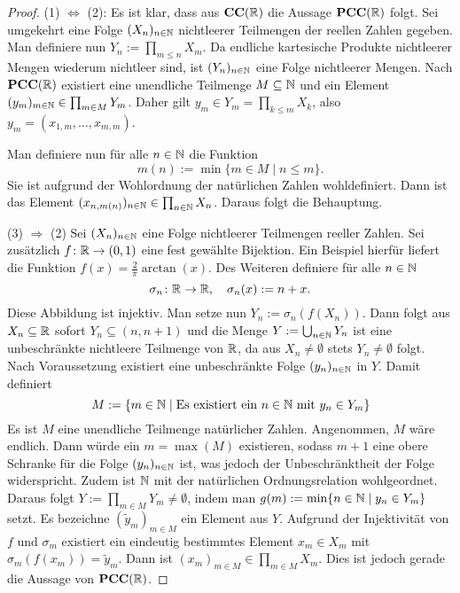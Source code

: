 \begin{proof}
  (1) $\Leftrightarrow$ (2):
  Es ist klar, dass aus $\mathbf{CC}(\mathbb{R})$ die Aussage $\mathbf{PCC}(\mathbb{R})$ folgt.
  Sei umgekehrt eine Folge $(X_n)_{n \in \mathbb{N}}$ nichtleerer Teilmengen der reellen Zahlen gegeben.
  Man definiere nun $Y_n := \prod_{m \leq n} X_m$.
  Da endliche kartesische Produkte nichtleerer Mengen wiederum nichtleer sind, ist $(Y_n)_{n \in \mathbb{N}}$ eine Folge nichtleerer Mengen.
  Nach $\mathbf{PCC}(\mathbb{R})$ existiert eine unendliche Teilmenge $M \subseteq \mathbb{N}$ und ein Element $(y_m)_{m \in \mathbb{N}} \in \prod_{m \in M} Y_m$.
  Daher gilt $y_m \in Y_m = \prod_{k \leq m} X_k$, also $y_m = (x_{1,m},\dots,x_{m,m})$.

  Man definiere nun für alle $n \in \mathbb{N}$ die Funktion
  \begin{displaymath}
    m(n) := \min\{m \in M \mid n \leq m\}.
  \end{displaymath}
  Sie ist aufgrund der Wohlordnung der natürlichen Zahlen wohldefiniert.
  Dann ist das Element $(x_{n,m(n)})_{n \in \mathbb{N}} \in \prod_{n \in \mathbb{N}} X_n$.
  Daraus folgt die Behauptung.

  (3) $\Rightarrow$ (2)
  Sei $(X_n)_{n \in \mathbb{N}}$ eine Folge nichtleerer Teilmengen reeller Zahlen.
  Sei zusätzlich $f \colon \mathbb{R} \to (0,1)$ eine fest gewählte Bijektion.
  Ein Beispiel hierfür liefert die Funktion $f(x) = \frac{2}{\pi}\arctan(x)$.
  Des Weiteren definiere für alle $n \in \mathbb{N}$
  \begin{displaymath}
    \sigma_n \colon \mathbb{R} \to \mathbb{R}, \quad \sigma_n(x) := n + x.
  \end{displaymath}
  Diese Abbildung ist injektiv.
  Man setze nun $Y_n := \sigma_n(f(X_n))$. 
  Dann folgt aus $X_n \subseteq \mathbb{R}$ sofort $Y_n \subseteq (n,n+1)$ und die Menge $Y:= \bigcup_{n \in \mathbb{N}} Y_n$ ist eine unbeschränkte nichtleere Teilmenge von $\mathbb{R}$, da aus $X_n \neq \emptyset$ stets $Y_n \neq \emptyset$ folgt.
  Nach Voraussetzung existiert eine unbeschränkte Folge $(y_n)_{n \in \mathbb{N}}$ in $Y$.
  Damit definiert
  \begin{displaymath}
    M := \{m \in \mathbb{N} \mid \text{Es existiert ein } n \in \mathbb{N} \text{ mit } y_n \in Y_m\}
  \end{displaymath}
  Es ist $M$ eine unendliche Teilmenge natürlicher Zahlen.
  Angenommen, $M$ wäre endlich.
  Dann würde ein $m = \max(M)$ existieren, sodass $m + 1$ eine obere Schranke für die Folge $(y_n)_{n \in \mathbb{N}}$ ist, was jedoch der Unbeschränktheit der Folge widerspricht.
  Zudem ist $\mathbb{N}$ mit der natürlichen Ordnungsrelation wohlgeordnet.
  Daraus folgt $Y := \prod_{m \in M} Y_m \neq \emptyset$, indem man $g(m) := \min\{n \in \mathbb{N} \mid y_n \in Y_m\}$ setzt.
  Es bezeichne $(\tilde{y}_m)_{m \in M}$ ein Element aus $Y$.
  Aufgrund der Injektivität von $f$ und $\sigma_m$ existiert ein eindeutig bestimmtes Element $x_m \in X_m$ mit $\sigma_m(f(x_m)) = \tilde{y}_m$.
  Dann ist $(x_m)_{m \in M} \in \prod_{m \in M} X_m$.
  Dies ist jedoch gerade die Aussage von $\mathbf{PCC}(\mathbb{R})$.
\end{proof}


